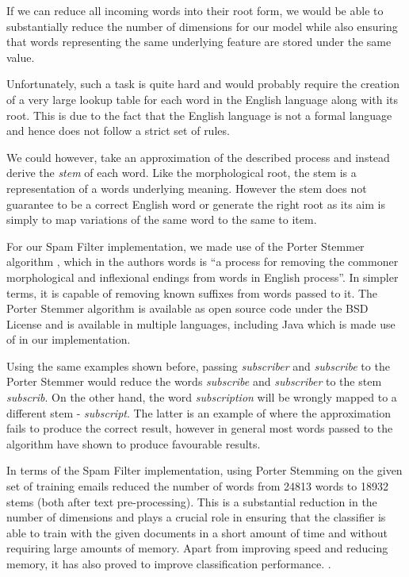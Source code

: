 If we can reduce all incoming words into their root form, we would be able to substantially reduce the number of dimensions for our model while also ensuring that words representing the same underlying feature are stored under the same value.

Unfortunately, such a task is quite hard and would probably require the creation of a very large lookup table for each word in the English language along with its root. This is due to the fact that the English language is not a formal language and hence does not follow a strict set of rules. 

We could however, take an approximation of the described process and instead derive the {\it stem} of each word. Like the morphological root, the stem is a representation of a words underlying meaning. However the stem does not guarantee to be a correct English word or generate the right root as its aim is simply to map variations of the same word to the same to item. 

For our Spam Filter implementation, we made use of the Porter Stemmer algorithm \cite{porter1980}, which in the authors words is ``a process for removing the commoner morphological and inflexional endings from words in English process''. In simpler terms, it is capable of removing known suffixes from words passed to it. The Porter Stemmer algorithm is available as open source code under the BSD License and is available in multiple languages, including Java which is made use of in our implementation.

Using the same examples shown before, passing {\it subscriber} and {\it subscribe} to the Porter Stemmer would reduce the words {\it subscribe} and {\it subscriber} to the stem {\it subscrib}. On the other hand, the word {\it subscription} will be wrongly mapped to a different stem - {\it subscript}. The latter is an example of where the approximation fails to produce the correct result, however in general most words passed to the algorithm have shown to produce favourable results.

In terms of the Spam Filter implementation, using Porter Stemming on the given set of training emails reduced the number of words from 24813 words to 18932 stems (both after text pre-processing). This is a substantial reduction in the number of dimensions and plays a crucial role in ensuring that the classifier is able to train with the given documents in a short amount of time and without requiring large amounts of memory. Apart from improving speed and reducing memory, it has also proved to improve classification performance. .

